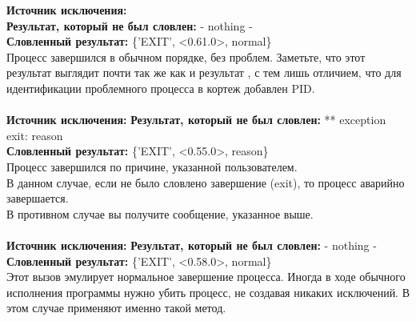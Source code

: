 \begin{minipage}{1.0\linewidth}
    \textbf{Источник исключения:} \\
    \textbf{Результат, который не был словлен:} - nothing -\\
    \textbf{Словленный результат:} \{'EXIT', <0.61.0>, normal\}\\
    Процесс завершился в обычном порядке, без проблем.
    Заметьте, что этот результат выглядит почти так же как и результат , с тем лишь отличием, что для идентификации проблемного процесса в кортеж добавлен PID.\\
    \\
    \textbf{Источник исключения:} 
    \textbf{Результат, который не был словлен:} ** exception exit: reason\\
    \textbf{Словленный результат:} \{'EXIT', <0.55.0>, reason\}\\
    Процесс завершился по причине, указанной пользователем.\\
    В данном случае, если не было словлено завершение (exit), то процесс аварийно завершается.\\
    В противном случае вы получите сообщение, указанное выше.\\
    \\
    \textbf{Источник исключения:} 
    \textbf{Результат, который не был словлен:} - nothing -\\
    \textbf{Словленный результат:} \{'EXIT', <0.58.0>, normal\}\\
    Этот вызов эмулирует нормальное завершение процесса.
    Иногда в ходе обычного  исполнения программы нужно убить процесс, не создавая никаких исключений.
    В этом  случае применяют именно такой метод.
\end{minipage}
